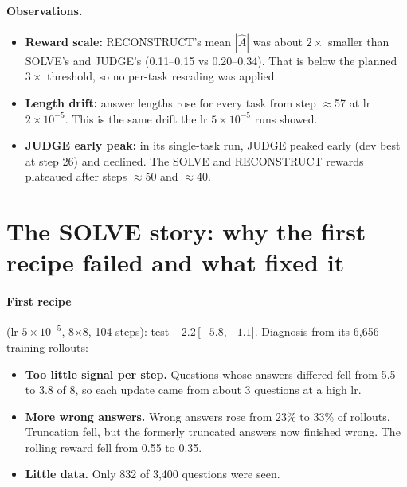 \documentclass[10pt,a4paper]{article}
\newcommand{\ci}[2]{\,{\scriptsize[#1,\,#2]}}
\begin{document}
\paragraph{Observations.}
\begin{itemize}
\item \textbf{Reward scale:} RECONSTRUCT's mean $|\hat A|$ was about $2\times$ smaller than SOLVE's and JUDGE's
      (0.11--0.15 vs 0.20--0.34). That is below the planned $3\times$ threshold, so no per-task rescaling was
      applied.
\item \textbf{Length drift:} answer lengths rose for every task from step $\approx$57 at lr $2\times10^{-5}$. This is
      the same drift the lr $5\times10^{-5}$ runs showed.
\item \textbf{JUDGE early peak:} in its single-task run, JUDGE peaked early (dev best at step 26) and declined. The
      SOLVE and RECONSTRUCT rewards plateaued after steps $\approx$50 and $\approx$40.
\end{itemize}

\section{The SOLVE story: why the first recipe failed and what fixed it}
\label{sec:solve}

\paragraph{First recipe} (lr $5\times10^{-5}$, 8$\times$8, 104 steps): test $-2.2$\ci{$-5.8$}{$+1.1$}. Diagnosis from
its 6,656 training rollouts:
\begin{itemize}
\item \textbf{Too little signal per step.} Questions whose answers differed fell from 5.5 to 3.8 of 8, so each update
      came from about 3 questions at a high lr.
\item \textbf{More wrong answers.} Wrong answers rose from 23\% to 33\% of rollouts. Truncation fell, but the formerly
      truncated answers now finished wrong. The rolling reward fell from 0.55 to 0.35.
\item \textbf{Little data.} Only 832 of 3,400 questions were seen.
\end{itemize}
\end{document}
